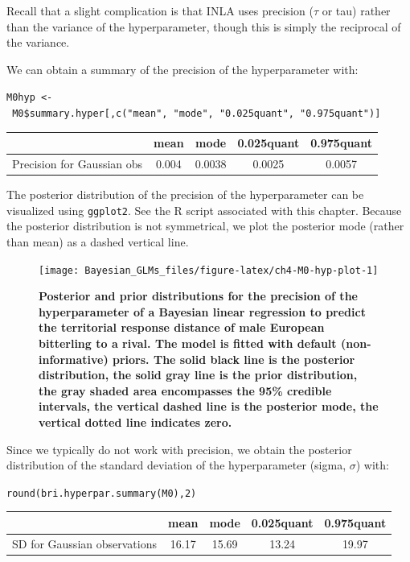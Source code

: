 \documentclass[
]{book}
\begin{document}
Recall that a slight complication is that INLA uses precision (\(\tau\) or tau) rather than the variance of the hyperparameter, though this is simply the reciprocal of the variance.

We can obtain a summary of the precision of the hyperparameter with:

\texttt{M0hyp\ \textless{}-\ M0\$summary.hyper{[},c("mean",\ "mode",\ "0.025quant",\ "0.975quant"){]}}

\begin{longtable}[]{@{}ccccc@{}}
\toprule
& mean & mode & 0.025quant & 0.975quant \\
\midrule
\endhead
Precision for Gaussian obs & 0.004 & 0.0038 & 0.0025 & 0.0057 \\
\bottomrule
\end{longtable}

The posterior distribution of the precision of the hyperparameter can be visualized using \texttt{ggplot2}. See the R script associated with this chapter. Because the posterior distribution is not symmetrical, we plot the posterior mode (rather than mean) as a dashed vertical line.



\begin{figure}

{\centering \texttt{[image: Bayesian\_GLMs\_files/figure-latex/ch4-M0-hyp-plot-1]} 

}

\caption{\textbf{Posterior and prior distributions for the precision of the hyperparameter of a Bayesian linear regression to predict the territorial response distance of male European bitterling to a rival. The model is fitted with default (non-informative) priors. The solid black line is the posterior distribution, the solid gray line is the prior distribution, the gray shaded area encompasses the 95\% credible intervals, the vertical dashed line is the posterior mode, the vertical dotted line indicates zero.}}\label{fig:ch4-M0-hyp-plot}
\end{figure}

Since we typically do not work with precision, we obtain the posterior distribution of the standard deviation of the hyperparameter (sigma, \(\sigma\)) with:

\texttt{round(bri.hyperpar.summary(M0),2)}

\begin{longtable}[]{@{}ccccc@{}}
\toprule
& mean & mode & 0.025quant & 0.975quant \\
\midrule
\endhead
SD for Gaussian observations & 16.17 & 15.69 & 13.24 & 19.97 \\
\bottomrule
\end{longtable}
\end{document}
